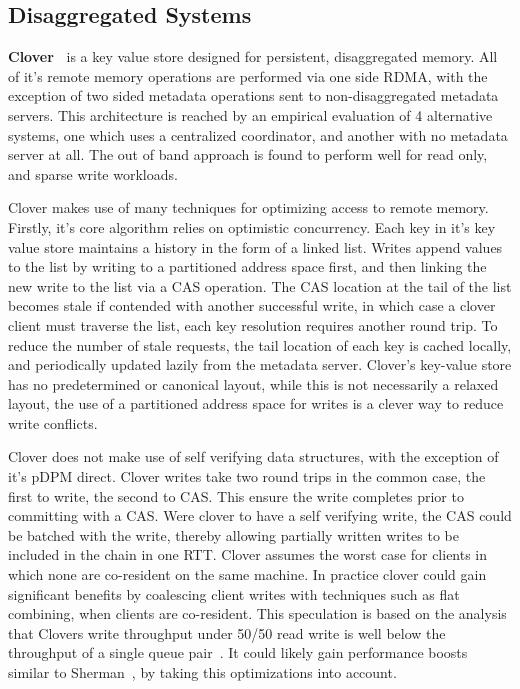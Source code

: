 

\subsection{Disaggregated Systems}

\textbf{Clover~\cite{clover}}
is a key value store designed for persistent, disaggregated memory. All
of it's remote memory operations are performed via one side RDMA, with the
exception of two sided metadata operations sent to non-disaggregated metadata
servers. This architecture is reached by an empirical evaluation of 4
alternative systems, one which uses a centralized coordinator, and another with
no metadata server at all. The out of band approach is found to perform well for
read only, and sparse write workloads. 

Clover makes use of many techniques for optimizing access to remote memory.
Firstly, it's core algorithm relies on optimistic concurrency. Each key in it's
key value store maintains a history in the form of a linked list. Writes append
values to the list by writing to a partitioned address space first, and then
linking the new write to the list via a CAS operation. The CAS location at the
tail of the list becomes stale if contended with another successful write, in
which case a clover client must traverse the list, each key resolution requires
another round trip. To reduce the number of stale requests, the tail location of
each key is cached locally, and periodically updated lazily from the metadata
server. Clover's key-value store has no predetermined or canonical layout, while
this is not necessarily a relaxed layout, the use of a partitioned address space
for writes is a clever way to reduce write conflicts.

Clover does not make use of self verifying data
structures, with the exception of it's pDPM direct. Clover writes take two round
trips in the common case, the first to write, the second to CAS. This ensure the
write completes prior to committing with a CAS. Were clover to have a self
verifying write, the CAS could be batched with the write, thereby allowing
partially written writes to be included in the chain in one RTT. Clover assumes
the worst case for clients in which none are co-resident on the same machine. In
practice clover could gain significant benefits by coalescing client writes with
techniques such as flat combining, when clients are co-resident. This
speculation is based on the analysis that Clovers write throughput under 50/50
read write is well below the throughput of a single queue
pair~\cite{design-guidelines}. It could likely gain performance boosts similar
to Sherman~\cite{sherman}, by taking this optimizations into account. 


